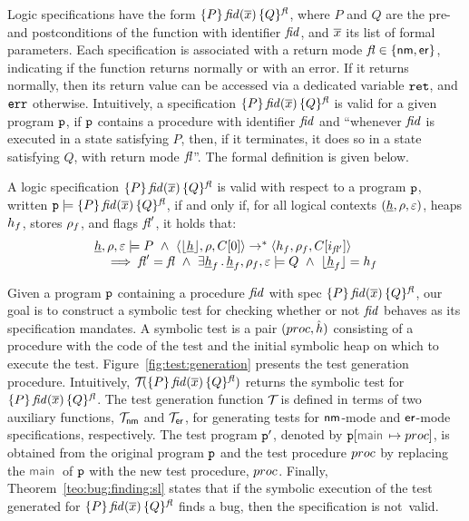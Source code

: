 \jsil Logic specifications have the form $\{ P \} \, \mathit{fid}(\overline{x}) \, \{ Q \}^{\mathit{fl}}$, where $P$ and $Q$ are the 
pre- and postconditions of the function with identifier $\mathit{fid}$, and $\overline{x}$ its list of formal parameters.
Each specification is associated with a return mode $\mathit{fl} \in \{ {\sf nm}, {\sf er} \}$, indicating if the function
 returns normally or with an error. If it returns normally, then its return value can be accessed  via a dedicated variable 
 $\mathtt{ret}$, and $\mathtt{err}$ otherwise.  Intuitively, a specification $\{ P \} \, \mathit{fid}(\overline{x}) \, \{ Q \}^{\mathit{fl}}$ is 
valid for a given \jsil program $\mathtt{p}$, if $\mathtt{p}$ contains a procedure with identifier 
$\mathit{fid}$ and ``whenever $\mathit{fid}$ is executed in a state satisfying $P$, then, 
if it terminates, it does so in a state satisfying $Q$, with return mode $\mathit{fl}$''.
The formal definition is given below. 


\begin{definition}
A \jsil logic specification $\{ P \} \, \mathit{fid}(\overline{x}) \, \{ Q \}^{\mathit{fl}}$ is valid with respect to a program 
$\mathtt{p}$, written $\mathtt{p} \models \{ P \} \, \mathit{fid}(\overline{x}) \, \{ Q \}^{\mathit{fl}}$,  if and only if, for all logical 
contexts $(\underline{h}, \rho, \varepsilon)$, heaps $h_f$, stores $\rho_f$, and flags $\mathit{fl}'$, it holds that: 
$$
\begin{array}{l}
    \iheap, \store, \senv \satisfies P \ \wedge \ \tuple{\deabstract{\iheap}, \store, \ctx[0]} \rightarrow^* \tuple{\heap_f, \store_f, \ctx[i_{\flag'}]} \\
       \quad \implies
            \flag' = \flag \ \wedge \ \exists \iheap_f \, . \, \iheap_f, \store_f, \senv \satisfies Q \ \wedge \ \deabstract{\iheap_f} = \heap_f
\end{array}
$$
\end{definition}

\noindent Given a \jsil program $\mathtt{p}$ containing a procedure $\mathit{fid}$ with spec {\small $\{ P \} \, \mathit{fid}(\overline{x}) \, \{ Q \}^{\mathit{fl}}$}, 
our goal is to construct a symbolic test for checking whether or not $\mathit{fid}$ behaves as its specification mandates.
A symbolic test is a pair $(proc, \hat{h})$ consisting of a \jsil procedure with the code of the test and the initial 
symbolic heap on which to execute the test. 
%
Figure~\ref{fig:test:generation} presents the test generation procedure. Intuitively, ${\mathcal{T}}_{}(\{ P \} \, \mathit{fid}(\overline{x}) \, \{ Q \}^{\mathit{fl}})$ 
returns the symbolic test for $\{ P \} \, \mathit{fid}(\overline{x}) \, \{ Q \}^{\mathit{fl}}$. The test generation function ${\mathcal{T}}_{}$ is defined in terms 
of two auxiliary functions, ${\mathcal{T}}_{{\sf nm}}$ and ${\mathcal{T}}_{{\sf er}}$, for generating tests for ${\sf nm}$-mode and 
${\sf er}$-mode specifications, respectively. 
The test program $\mathtt{p}'$, denoted by $\prog[\jsilmain \mapsto \proc]$, is obtained from the original program $\mathtt{p}$ and the test procedure $proc$ by replacing the 
$\jsilmain$ of $\mathtt{p}$ with the new test procedure, $proc$. 
%
Finally, Theorem~\ref{teo:bug:finding:sl} states that if the symbolic execution of the 
test generated for $\{ P \} \, \mathit{fid}(\overline{x}) \, \{ Q \}^{\mathit{fl}}$ finds a bug, then the specification 
is not~valid.

